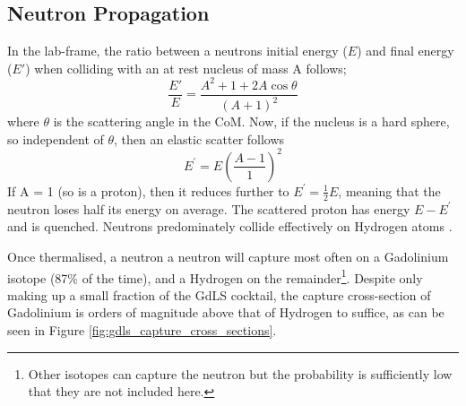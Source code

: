 \subsection{Neutron Propagation}
\par
In the lab-frame, the ratio between a neutrons initial energy ($E$) and final energy ($E'$) when colliding with an at rest nucleus of mass A follows;
\begin{equation}
    \frac{E'}{E} = \frac{A^2 + 1 + 2A\cos{\theta}}{(A + 1)^2}
\end{equation}
where $\theta$ is the scattering angle in the CoM.
Now, if the nucleus is a hard sphere, so independent of $\theta$, then an elastic scatter follows
\begin{equation}
    E^{'} = E(\frac{A-1}{1})^{2}
\end{equation}
If A = 1 (so is a proton), then it reduces further to $E^{'} = \frac{1}{2}E$, meaning that the neutron loses half its energy on average.
The scattered proton has energy $E - E^{'}$ and is quenched.
Neutrons predominately collide effectively on Hydrogen atoms \cite{neutron_thermalisation_and_capture_ref}.

\par
Once thermalised, a neutron a neutron will capture most often on a Gadolinium isotope (87\% of the time), and a Hydrogen on the remainder\footnote{Other isotopes can capture the neutron but the probability is sufficiently low that they are not included here.}.
Despite only making up a small fraction of the GdLS cocktail, the capture cross-section of Gadolinium is orders of magnitude above that of Hydrogen to suffice, as can be seen in Figure \ref{fig:gdls_capture_cross_sections}.



